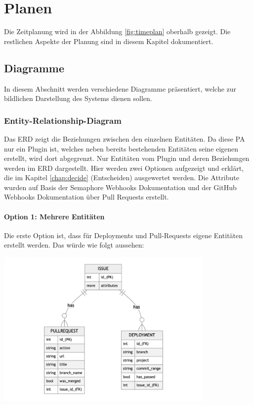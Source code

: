\chapter{Planen}
\label{chap:plan}
Die Zeitplanung wird in der Abbildung \ref{fig:timeplan} oberhalb gezeigt. Die restlichen Aspekte der Planung sind in diesem Kapitel dokumentiert.

\section{Diagramme}
In diesem Abschnitt werden verschiedene Diagramme präsentiert, welche zur bildlichen Darstellung des Systems dienen sollen.
\subsection{Entity-Relationship-Diagram}
Das ERD zeigt die Beziehungen zwischen den einzelnen Entitäten. Da diese PA nur ein Plugin ist, welches neben
bereits bestehenden Entitäten seine eigenen erstellt, wird dort abgegrenzt. Nur Entitäten vom Plugin und
deren Beziehungen werden im ERD dargestellt. \newline
Hier werden zwei Optionen aufgezeigt und erklärt, die im Kapitel \ref{chap:decide} (Entscheiden) ausgewertet werden. \newline
Die Attribute wurden auf Basis der Semaphore Webhooks Dokumentation \cite{semaphore_webhooks} und der GitHub Webhooks
Dokumentation über Pull Requests \cite{github_webhooks_pr} erstellt.

\begin{minipage}{\textwidth}
  \subsubsection{Option 1: Mehrere Entitäten}
  Die erste Option ist, dass für Deployments und Pull-Requests eigene Entitäten erstellt werden. Das würde wie folgt aussehen:
  \begin{center}
    \includegraphics[width=0.8\textwidth]{images/erd/multiple.png}
    \label{fig:erd_multiple}
  \end{center}
\end{minipage}

